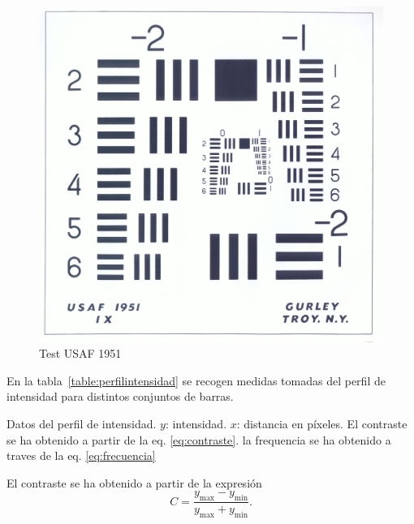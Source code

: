 \documentclass{../packages/optica-article}
\begin{document}
\begin{figure}[htbp]
	\centering
	\includegraphics[scale=0.05]{testusaf1951}
	\caption{Test USAF 1951}\label{fig:usaf1951}
\end{figure}

En la tabla~\ref{table:perfilintensidad} se recogen medidas tomadas del perfil de intensidad para distintos conjuntos de barras.

\begin{table}[p]
	\centering
	\caption{Datos del perfil de intensidad. $y$: intensidad. $x$: distancia en píxeles. El contraste se ha obtenido a partir de la eq. \ref{eq:contraste}. la frequencia se ha obtenido a traves de la eq. \ref{eq:frecuencia}}%
	\label{table:perfilintensidad}
\end{table}

El contraste se ha obtenido a partir de la expresión
\nolinebreak
\begin{equation}
	C = \frac{y_{\max} - y_{\min}}{y_{\max} + y_{\min}}.
	\label{eq:contraste}
\end{equation}
\end{document}
